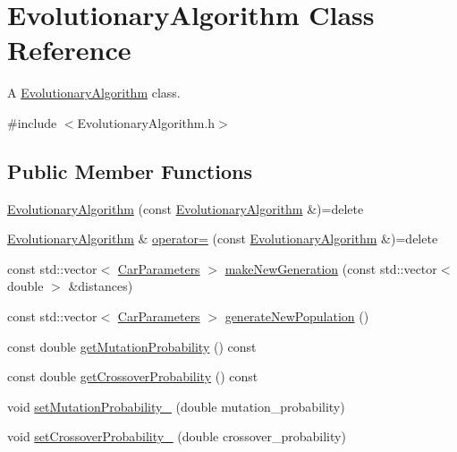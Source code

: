 \hypertarget{classEvolutionaryAlgorithm}{}\section{Evolutionary\+Algorithm Class Reference}
\label{classEvolutionaryAlgorithm}


A \hyperlink{classEvolutionaryAlgorithm}{Evolutionary\+Algorithm} class.  




{\ttfamily \#include $<$Evolutionary\+Algorithm.\+h$>$}

\subsection*{Public Member Functions}
\begin{DoxyCompactItemize}
\item 
\hyperlink{classEvolutionaryAlgorithm_ae93cddd09649e8077b553c09919542b4}{Evolutionary\+Algorithm} (const \hyperlink{classEvolutionaryAlgorithm}{Evolutionary\+Algorithm} \&)=delete
\item 
\hyperlink{classEvolutionaryAlgorithm}{Evolutionary\+Algorithm} \& \hyperlink{classEvolutionaryAlgorithm_a4726d79d2cfc00b01f521a2fb8b87863}{operator=} (const \hyperlink{classEvolutionaryAlgorithm}{Evolutionary\+Algorithm} \&)=delete
\item 
const std\+::vector$<$ \hyperlink{classCarParameters}{Car\+Parameters} $>$ \hyperlink{classEvolutionaryAlgorithm_aa4dc48e8ad0d0e5892546ce6978f492f}{make\+New\+Generation} (const std\+::vector$<$ double $>$ \&distances)
\item 
const std\+::vector$<$ \hyperlink{classCarParameters}{Car\+Parameters} $>$ \hyperlink{classEvolutionaryAlgorithm_aad3e66c5d020fdcf1cb1e5ade0f01385}{generate\+New\+Population} ()
\item 
const double \hyperlink{classEvolutionaryAlgorithm_ae2aa7a6fdbfb3a065aecdb7a5488bcc6}{get\+Mutation\+Probability} () const
\item 
const double \hyperlink{classEvolutionaryAlgorithm_a71ca76fa04d0824bf7cf86b67fc65414}{get\+Crossover\+Probability} () const
\item 
void \hyperlink{classEvolutionaryAlgorithm_a2f47cbcc3c2b886ece5ba97bbfed4178}{set\+Mutation\+Probability\+\_\+} (double mutation\+\_\+probability)
\item 
void \hyperlink{classEvolutionaryAlgorithm_ab5951bdd3eec16074aff63349726dee8}{set\+Crossover\+Probability\+\_\+} (double crossover\+\_\+probability)

\end{DoxyCompactItemize}
